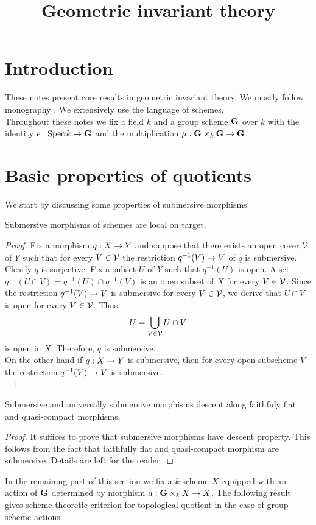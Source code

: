 



\title{Geometric invariant theory}
\date{}
\maketitle

\section{Introduction}
\noindent
These notes present core results in geometric invariant theory. We mostly follow monography \cite{mumford1994geometric}. We extensively use the language of schemes.\\
Throughout these notes we fix a field $k$ and a group scheme $\mathbf{G}$ over $k$ with the identity $e:\mathrm{Spec}\, k\rightarrow \mathbf{G}$ and the multiplication $\mu:\mathbf{G}\times_k\mathbf{G}\rightarrow \mathbf{G}$. 

\section{Basic properties of quotients}
\noindent
We start by discussing some properties of submersive morphisms.

\begin{fact}\label{fact:submersive_morphisms_are_local_on_target}
Submersive morphisms of schemes are local on target.
\end{fact}
\begin{proof}
Fix a morphism $q:X\rightarrow Y$ and suppose that there exists an open cover ${\mathcal V}$ of $Y$ such that for every $V\in {\mathcal V}$ the restriction $q^{-1}(V)\rightarrow V$ of $q$ is submersive. Clearly $q$ is surjective. Fix a subset $U$ of $Y$ such that $q^{-1}(U)$ is open. A set $q^{-1}(U\cap V) = q^{-1}(U)\cap q^{-1}(V)$ is an open subset of $X$ for every $V\in {\mathcal V}$. Since the restriction $q^{-1}(V)\rightarrow V$ is submersive for every $V\in {\mathcal V}$, we derive that $U\cap V$ is open for every $V\in {\mathcal V}$. Thus
$$U = \bigcup_{V\in {\mathcal V}}U\cap V$$
is open in $X$. Therefore, $q$ is submersive.\\
On the other hand if $q:X\rightarrow Y$ is submersive, then for every open subscheme $V$ the restriction $q^{-1}(V)\rightarrow V$ is submersive.\\
\end{proof}

\begin{fact}\label{fact:submersive_and_universally_submersive_descent_along_fpgc}
Submersive and universally submersive morphisms descent along faithfuly flat and quasi-compact morphisms.
\end{fact}
\begin{proof}
It suffices to prove that submersive morphisms have descent property. This follows from the fact that faithfully flat and quasi-compact morphism are submersive. Details are left for the reader.
\end{proof}
\noindent
In the remaining part of this section we fix a $k$-scheme $X$ equipped with an action of $\mathbf{G}$ determined by morphism $a:\mathbf{G}\times_kX\rightarrow X$. The following result gives scheme-theoretic criterion for topological quotient in the case of group scheme actions.

